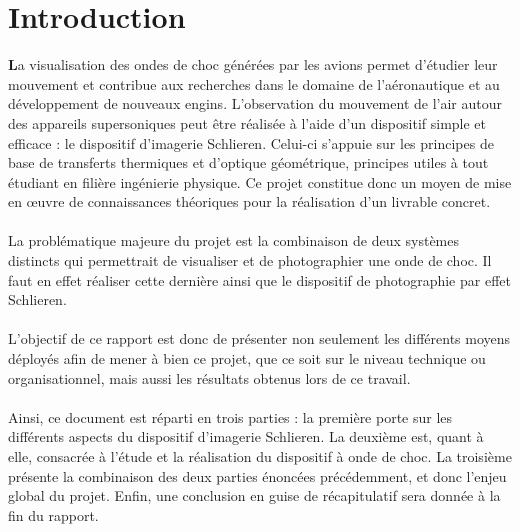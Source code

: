 \section*{Introduction}
\textbf{L}a visualisation des ondes de choc générées par les avions permet d’étudier leur mouvement et contribue aux recherches dans le domaine de l’aéronautique et au développement de nouveaux engins. L’observation du mouvement de l’air autour des appareils supersoniques peut être réalisée à l’aide d’un dispositif simple et efficace : le dispositif d’imagerie Schlieren. Celui-ci s’appuie sur les principes de base de transferts thermiques et d’optique géométrique,  principes utiles à tout étudiant en filière ingénierie physique. Ce projet constitue donc un moyen de mise en œuvre de connaissances théoriques pour la réalisation d’un livrable concret.
\\
\\
La problématique majeure du projet est la combinaison de deux systèmes distincts qui permettrait de visualiser et de photographier une onde de choc. Il faut en effet réaliser cette dernière ainsi que le dispositif de photographie par effet Schlieren.
\\
\\
L’objectif de ce rapport est donc de présenter non seulement les différents moyens déployés afin de mener à bien ce projet, que ce soit sur le niveau technique ou organisationnel, mais aussi les résultats obtenus lors de ce travail.
\\
\\
Ainsi, ce document est réparti en trois parties : la première porte sur les différents aspects du dispositif d’imagerie Schlieren. La deuxième est, quant à elle, consacrée à l'étude et la réalisation du dispositif à onde de choc. La troisième présente la combinaison des deux parties énoncées précédemment, et donc l'enjeu global du projet. Enfin, une conclusion en guise de récapitulatif sera donnée à la fin du rapport.
